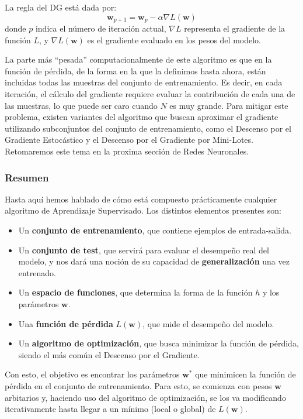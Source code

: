 \documentclass[../../main.tex]{subfiles}
\begin{document}
La regla del DG está dada por:
\[
\bm{w}_{p+1} = \bm{w}_{p} - \alpha \nabla L(\bm{w})
\]
donde \(p\) indica el número de iteración actual, \(\nabla L\) representa el
gradiente de la función \(L\), y \(\nabla L(\bm{w})\) es el gradiente evaluado
en los pesos del modelo.

La parte más ``pesada'' computacionalmente de este algoritmo es que en la función de
pérdida, de la forma en la que la definimos hasta ahora, están incluidas todas las
muestras del conjunto de entrenamiento. Es decir, en cada iteración, el cálculo del
gradiente requiere evaluar la contribución de cada una de las muestras, lo que puede ser
caro cuando \(N\) es muy grande. Para mitigar este problema, existen variantes del
algoritmo que buscan aproximar el gradiente utilizando subconjuntos del conjunto de
entrenamiento, como el Descenso por el Gradiente Estocástico y el Descenso por el
Gradiente por Mini-Lotes. Retomaremos este tema en la proxima sección de Redes Neuronales.

\subsubsection{Resumen}
Hasta aquí hemos hablado de cómo está compuesto prácticamente cualquier algoritmo de
Aprendizaje Supervisado. Los distintos elementos presentes son:
\begin{itemize}[noitemsep]
    \item Un \textbf{conjunto de entrenamiento}, que contiene ejemplos de entrada-salida.
    \item Un \textbf{conjunto de test}, que servirá para evaluar el desempeño real del modelo,
    y nos dará una noción de su capacidad de \textbf{generalización} una vez entrenado.
    \item Un \textbf{espacio de funciones}, que determina la forma de la función \(h\) y los
    parámetros \(\bm{w}\).
    \item Una \textbf{función de pérdida} \(L(\bm{w})\), que mide el desempeño del modelo.
    \item Un \textbf{algoritmo de optimización}, que busca minimizar la función de pérdida,
    siendo el más común el Descenso por el Gradiente.
\end{itemize}

Con esto, el objetivo es encontrar los parámetros \(\bm{w}^*\) que minimicen la función de
pérdida en el conjunto de entrenamiento. Para esto, se comienza con pesos \(\bm{w}\)
arbitarios y, haciendo uso del algoritmo de optimización, se los va modificando iterativamente
hasta llegar a un mínimo (local o global) de \(L(\bm{w})\).
\end{document}
